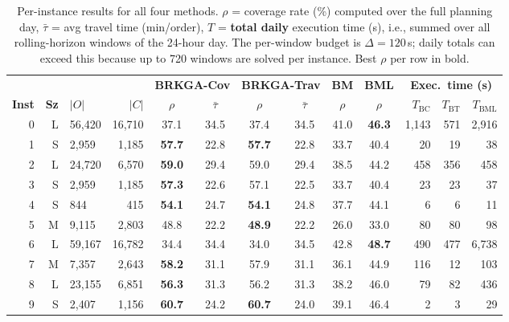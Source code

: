 \begin{table}[ht]
\centering
\caption{Per-instance results for all four methods.
$\rho$ = coverage rate (\%) computed over the full planning day,
$\bar{\tau}$ = avg travel time (min/order),
$T$ = \textbf{total daily} execution time (s), i.e., summed over all
rolling-horizon windows of the 24-hour day.
The per-window budget is $\Delta = 120$\,s; daily totals can exceed
this because up to 720 windows are solved per instance.
Best $\rho$ per row in bold.}
\label{tab:results_all}
\scriptsize
\setlength{\tabcolsep}{2.8pt}
\begin{tabular}{rrlr|cc|cc|c|c|rrr}
\toprule
 & & & &
\multicolumn{2}{c|}{\textbf{BRKGA-Cov}} &
\multicolumn{2}{c|}{\textbf{BRKGA-Trav}} &
\textbf{BM} &
\textbf{BML} &
\multicolumn{3}{c}{\textbf{Exec.\ time (s)}} \\
\textbf{Inst} & \textbf{Sz} & $|O|$ & $|C|$ &
$\rho$ & $\bar{\tau}$ & $\rho$ & $\bar{\tau}$ &
$\rho$ & $\rho$ &
$T_{\text{BC}}$ & $T_{\text{BT}}$ & $T_{\text{BML}}$ \\
\midrule
0  & L & 56{,}420 & 16{,}710 & 37.1 & 34.5 & 37.4 & 34.5 & 41.0 & \textbf{46.3} & 1{,}143 &    571 & 2{,}916 \\
1  & S &  2{,}959 &  1{,}185 & \textbf{57.7} & 22.8 & \textbf{57.7} & 22.8 & 33.7 & 40.4 &      20 &     19 &    38 \\
2  & L & 24{,}720 &  6{,}570 & \textbf{59.0} & 29.4 & 59.0 & 29.4 & 38.5 & 44.2 &     458 &    356 &   458 \\
3  & S &  2{,}959 &  1{,}185 & \textbf{57.3} & 22.6 & 57.1 & 22.5 & 33.7 & 40.4 &      23 &     23 &    37 \\
4  & S &    844   &    415   & \textbf{54.1} & 24.7 & \textbf{54.1} & 24.8 & 37.7 & 44.1 &       6 &      6 &    11 \\
5  & M &  9{,}115 &  2{,}803 & 48.8 & 22.2 & \textbf{48.9} & 22.2 & 26.0 & 33.0 &      80 &     80 &    98 \\
6  & L & 59{,}167 & 16{,}782 & 34.4 & 34.4 & 34.0 & 34.5 & 42.8 & \textbf{48.7} &     490 &    477 & 6{,}738 \\
7  & M &  7{,}357 &  2{,}643 & \textbf{58.2} & 31.1 & 57.9 & 31.1 & 36.1 & 44.9 &     116 &     12 &   103 \\
8  & L & 23{,}155 &  6{,}851 & \textbf{56.3} & 31.3 & 56.2 & 31.3 & 38.2 & 46.0 &      79 &     82 &   436 \\
9  & S &  2{,}407 &  1{,}156 & \textbf{60.7} & 24.2 & \textbf{60.7} & 24.0 & 39.1 & 46.4 &       2 &      3 &    29 \\

\end{tabular}
\end{table}
